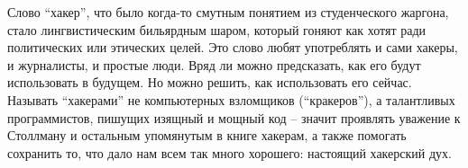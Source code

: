 Слово \enquote{хакер}, что было когда-то смутным понятием из студенческого жаргона, стало лингвистическим бильярдным шаром, который гоняют как хотят ради политических или этических целей. Это слово любят употреблять и сами хакеры, и журналисты, и простые люди. Вряд ли можно предсказать, как его будут использовать в будущем. Но можно решить, как использовать его сейчас. Называть \enquote{хакерами} не компьютерных взломщиков (\enquote{кракеров}), а талантливых программистов, пишущих изящный и мощный код -- значит проявлять уважение к Столлману и остальным упомянутым в книге хакерам, а также помогать сохранить то, что дало нам всем так много хорошего: настоящий хакерский дух.
